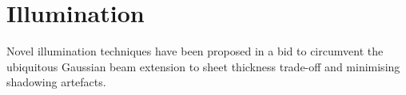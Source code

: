 





\section{Illumination}


Novel illumination techniques have been proposed in a bid to circumvent the ubiquitous Gaussian beam extension to sheet thickness trade-off and minimising shadowing artefacts.

